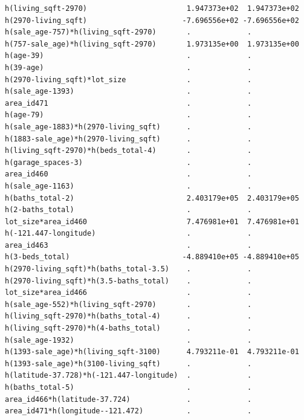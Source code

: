 \documentclass[
]{article}
\begin{document}
\begin{verbatim}
h(living_sqft-2970)                       1.947373e+02  1.947373e+02
h(2970-living_sqft)                      -7.696556e+02 -7.696556e+02
h(sale_age-757)*h(living_sqft-2970)       .             .           
h(757-sale_age)*h(living_sqft-2970)       1.973135e+00  1.973135e+00
h(age-39)                                 .             .           
h(39-age)                                 .             .           
h(2970-living_sqft)*lot_size              .             .           
h(sale_age-1393)                          .             .           
area_id471                                .             .           
h(age-79)                                 .             .           
h(sale_age-1883)*h(2970-living_sqft)      .             .           
h(1883-sale_age)*h(2970-living_sqft)      .             .           
h(living_sqft-2970)*h(beds_total-4)       .             .           
h(garage_spaces-3)                        .             .           
area_id460                                .             .           
h(sale_age-1163)                          .             .           
h(baths_total-2)                          2.403179e+05  2.403179e+05
h(2-baths_total)                          .             .           
lot_size*area_id460                       7.476981e+01  7.476981e+01
h(-121.447-longitude)                     .             .           
area_id463                                .             .           
h(3-beds_total)                          -4.889410e+05 -4.889410e+05
h(2970-living_sqft)*h(baths_total-3.5)    .             .           
h(2970-living_sqft)*h(3.5-baths_total)    .             .           
lot_size*area_id466                       .             .           
h(sale_age-552)*h(living_sqft-2970)       .             .           
h(living_sqft-2970)*h(baths_total-4)      .             .           
h(living_sqft-2970)*h(4-baths_total)      .             .           
h(sale_age-1932)                          .             .           
h(1393-sale_age)*h(living_sqft-3100)      4.793211e-01  4.793211e-01
h(1393-sale_age)*h(3100-living_sqft)      .             .           
h(latitude-37.728)*h(-121.447-longitude)  .             .           
h(baths_total-5)                          .             .           
area_id466*h(latitude-37.724)             .             .           
area_id471*h(longitude--121.472)          .             .           
                                                                    

\end{verbatim}
\end{document}
